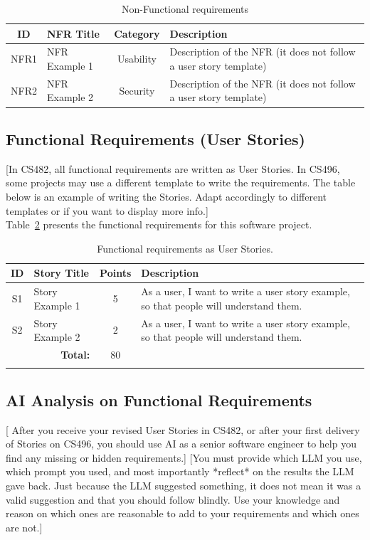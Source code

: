 \documentclass{article}
\begin{document}
\begin{table}[h!]
\centering
\begin{tabular}{c l c p{9cm}}
\hline
\textbf{ID} & \textbf{NFR Title} & \textbf{Category} & \textbf{Description} \\
\hline
NFR1 & NFR Example 1 & Usability & Description of the NFR (it does not follow a user story template) \\ \hline
NFR2 & NFR Example 2 & Security & Description of the NFR (it does not follow a user story template) \\ \hline
\end{tabular}
\caption{Non-Functional requirements}\label{tab:nfr}
\end{table}


\subsection{Functional Requirements (User Stories)}
[In CS482, all functional requirements are written as User Stories. In CS496, some projects may use a different template to write the requirements. The table below is an example of writing the Stories. Adapt accordingly to different templates or if you want to display more info.]\\

Table~\ref{tab:functional-req} presents the functional requirements for this software project.

\begin{longtable}[h]{c l c p{10cm}}
\hline
\textbf{ID} & \textbf{Story Title} & \textbf{Points} & \textbf{Description} \\
\hline
S1 & Story Example 1 & 5 & As a user, I want to write a user story example, so that people will understand them. \\ \hline
S2 & Story Example 2 & 2 & As a user, I want to write a user story example, so that people will understand them. \\ \hline

\multicolumn{2}{r}{\bf Total: } & 80 & \\ \hline



\caption{Functional requirements as User Stories.}\label{tab:functional-req}
\end{longtable}

\subsection{AI Analysis on Functional Requirements}
[ After you receive your revised User Stories in CS482, or after your first delivery of Stories on CS496, you should use AI as a senior software engineer to help you find any missing or hidden requirements.]
[You must provide which LLM you use, which prompt you used, and most importantly *reflect* on the results the LLM gave back. Just because the LLM suggested something, it does not mean it was a valid suggestion and that you should follow blindly. Use your knowledge and reason on which ones are reasonable to add to your requirements and which ones are not.]
\end{document}
